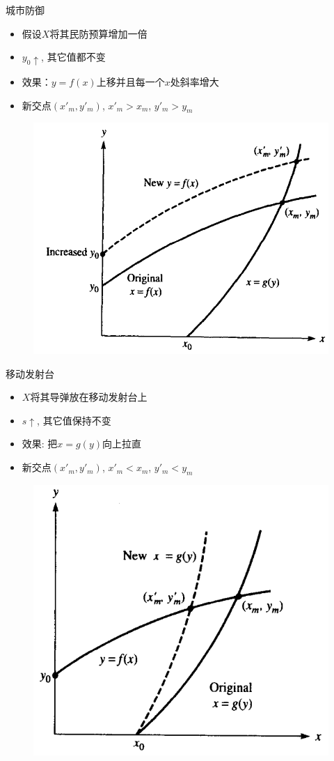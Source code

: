 \documentclass[mathserif, table]{beamer}
\begin{document}
\begin{frame}{城市防御}
  \begin{itemize}
  \item 假设$X$将其民防预算增加一倍
  \item $y_0\uparrow$, 其它值都不变
  \item 效果：$y=f(x)$上移并且每一个$x$处斜率增大
  \item 新交点$(x'_m, y'_m)$, $x'_m > x_m$, $y'_m > y_m$
  \end{itemize}

  \begin{figure}
    \centering
    \includegraphics[width=.5\textwidth]{cd.png}
  \end{figure}
  
\end{frame}

\begin{frame}{移动发射台}
  \begin{itemize}
  \item $X$将其导弹放在移动发射台上
  \item $s\uparrow$, 其它值保持不变
  \item 效果: 把$x=g(y)$向上拉直
  \item 新交点$(x'_m, y'_m)$, $x'_m < x_m$, $y'_m < y_m$
  \end{itemize}

  \begin{figure}
    \centering
    \includegraphics[width=.45\textwidth]{ml.png}
  \end{figure}

\end{frame}
\end{document}
